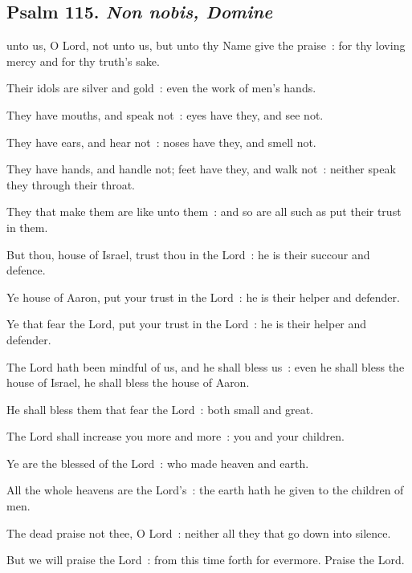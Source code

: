 \subsection{Psalm 115. \textit{Non nobis, Domine}}

 unto us, O Lord, not unto us, but unto thy Name give the praise~: for thy loving mercy and for thy truth's sake.\par
{}
Their idols are silver and gold~: even the work of men's hands.\par
{}They have mouths, and speak not~: eyes have they, and see not.\par
{}They have ears, and hear not~: noses have they, and smell not.\par
{}They have hands, and handle not; feet have they, and walk not~: neither speak they through their throat.\par
{}They that make them are like unto them~: and so are all such as put their trust in them.\par
{}But thou, house of Israel, trust thou in the Lord~: he is their succour and defence.\par
{}Ye house of Aaron, put your trust in the Lord~: he is their helper and defender.\par
{}Ye that fear the Lord, put your trust in the Lord~: he is their helper and defender.\par
{}The Lord hath been mindful of us, and he shall bless us~: even he shall bless the house of Israel, he shall bless the house of Aaron.\par
{}He shall bless them that fear the Lord~: both small and great.\par
{}The Lord shall increase you more and more~: you and your children.\par
{}Ye are the blessed of the Lord~: who made heaven and earth.\par
{}All the whole heavens are the Lord's~: the earth hath he given to the children of men.\par
{}The dead praise not thee, O Lord~: neither all they that go down into silence.\par
{}But we will praise the Lord~: from this time forth for evermore. Praise the Lord.\par

